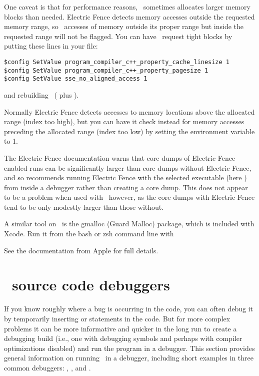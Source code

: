 One caveat is that for performance reasons, \OOMMF\ sometimes allocates
larger memory blocks than needed. Electric Fence detects memory
accesses outside the requested memory range, so \OOMMF\ accesses of
memory outside its proper range but inside the requested range will not
be flagged. You can have \OOMMF\ request tight blocks by putting these
lines in your  file:
\begin{verbatim}
$config SetValue program_compiler_c++_property_cache_linesize 1
$config SetValue program_compiler_c++_property_pagesize 1
$config SetValue sse_no_aligned_access 1
\end{verbatim}
and rebuilding \OOMMF\ ( plus ).

Normally Electric Fence detects accesses to memory locations above the
allocated range (index too high), but you can have it check
instead for memory accesses preceding the allocated range (index too
low) by setting the environment variable  to 1.

The Electric Fence documentation warns that core dumps of Electric Fence
enabled runs can be significantly larger than core dumps without
Electric Fence, and so recommends running Electric Fence with the
selected executable (here ) from inside a debugger rather than
creating a core dump. This does not appear to be a problem when used
with \OOMMF\ however, as the core dumps with Electric Fence tend to be
only modestly larger than those without.

A similar tool on \MacOSX\ is the gmalloc (Guard Malloc) package, which
is included with Xcode. Run it from the  bash or zsh
command line with
\begin{alltt}
% \shellcmd{DYLD_INSERT_LIBRARIES=/usr/lib/libgmalloc.dylib darwin/oxs boxsi.tcl foo.mif}
\end{alltt}\html{\newline}
See the documentation from Apple for full details.

\section{\Cplusplus\ source code debuggers}\label{sec:debug:debuggers}
If you know roughly where a bug is occurring in the code, you can often
debug it by temporarily inserting  or 
statements in the code. But for more complex problems it can be more
informative and quicker in the long run to create a debugging build (i.e.,
one with debugging symbols and perhaps with compiler optimizations
disabled) and run the program in a debugger. This section provides
general information on running \OOMMF\ in a debugger, including short
examples in three common debuggers: , , and .

